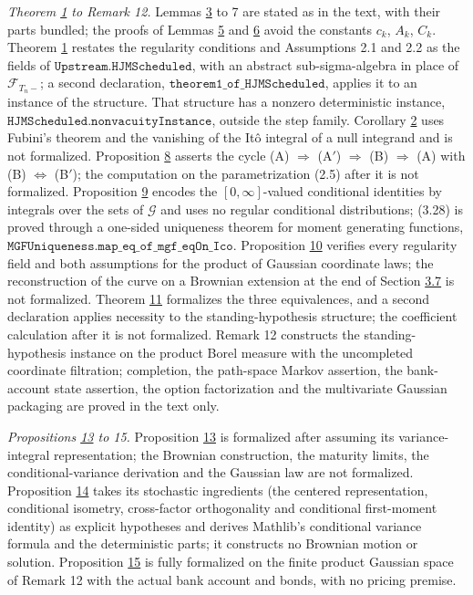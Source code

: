 \documentclass[11pt]{article}
\begin{document}
\emph{Theorem \hyperref[res:Theorem-1]{1} to Remark 12.} Lemmas \hyperref[res:Lemma-3]{3} to 7 are stated as in the text, with their parts bundled; the proofs of Lemmas \hyperref[res:Lemma-5]{5} and \hyperref[res:Lemma-6]{6} avoid the constants \(c_k\), \(A_k\), \(C_k\). Theorem \hyperref[res:Theorem-1]{1} restates the regularity conditions and Assumptions 2.1 and 2.2 as the fields of \(\texttt{Upstream.HJMScheduled}\), with an abstract sub-sigma-algebra in place of \(\mathcal F_{T_n-}\); a second declaration, \(\texttt{theorem1\_of\_HJMScheduled}\), applies it to an instance of the structure. That structure has a nonzero deterministic instance, \(\texttt{HJMScheduled.nonvacuityInstance}\), outside the step family. Corollary \hyperref[res:Corollary-2]{2} uses Fubini's theorem and the vanishing of the Itô integral of a null integrand and is not formalized. Proposition \hyperref[res:Proposition-8]{8} asserts the cycle (A) \(\Rightarrow\) (A\('\)) \(\Rightarrow\) (B) \(\Rightarrow\) (A) with (B) \(\Leftrightarrow\) (B\('\)); the computation on the parametrization (2.5) after it is not formalized. Proposition \hyperref[res:Proposition-9]{9} encodes the \([0,\infty]\)-valued conditional identities by integrals over the sets of \(\mathcal G\) and uses no regular conditional distributions; (3.28) is proved through a one-sided uniqueness theorem for moment generating functions, \(\texttt{MGFUniqueness.map\_eq\_of\_mgf\_eqOn\_Ico}\). Proposition \hyperref[res:Proposition-10]{10} verifies every regularity field and both assumptions for the product of Gaussian coordinate laws; the reconstruction of the curve on a Brownian extension at the end of Section \hyperref[sec:3.7]{3.7} is not formalized. Theorem \hyperref[res:Theorem-11]{11} formalizes the three equivalences, and a second declaration applies necessity to the standing-hypothesis structure; the coefficient calculation after it is not formalized. Remark 12 constructs the standing-hypothesis instance on the product Borel measure with the uncompleted coordinate filtration; completion, the path-space Markov assertion, the bank-account state assertion, the option factorization and the multivariate Gaussian packaging are proved in the text only.

\emph{Propositions \hyperref[res:Proposition-13]{13} to 15.} Proposition \hyperref[res:Proposition-13]{13} is formalized after assuming its variance-integral representation; the Brownian construction, the maturity limits, the conditional-variance derivation and the Gaussian law are not formalized. Proposition \hyperref[res:Proposition-14]{14} takes its stochastic ingredients (the centered representation, conditional isometry, cross-factor orthogonality and conditional first-moment identity) as explicit hypotheses and derives Mathlib's conditional variance formula and the deterministic parts; it constructs no Brownian motion or solution. Proposition \hyperref[res:Proposition-15]{15} is fully formalized on the finite product Gaussian space of Remark 12 with the actual bank account and bonds, with no pricing premise.
\end{document}
